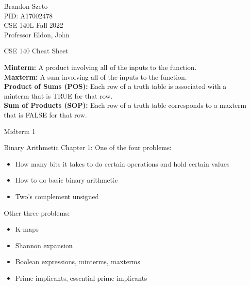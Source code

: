 \documentclass[10pt]{article}
\begin{document}
\begin{flushleft}
	Brandon Szeto \\
	PID: A17002478 \\
	CSE 140L Fall 2022 \\
    Professor Eldon, John \\

\begin{center}
	\Large CSE 140 Cheat Sheet
\end{center}

\textbf{Minterm:} A product involving all of the inputs to the function. \\
\textbf{Maxterm:} A sum involving all of the inputs to the function. \\
\textbf{Product of Sums (POS):} Each row of a truth table is associated with a
minterm that is TRUE for that row. \\
\textbf{Sum of Products (SOP):} Each row of a truth table corresponds to a
maxterm that is FALSE for that row. \\

\begin{center}
	\Large Midterm 1
\end{center}

Binary Arithmetic Chapter 1:
One of the four problems:
\begin{itemize}
    \item How many bits it takes to do certain operations and hold certain
        values
    \item How to do basic binary arithmetic 
    \item Two's complement unsigned
\end{itemize}

Other three problems:
\begin{itemize}
    \item K-maps
    \item Shannon expansion
    \item Boolean expressions, minterms, maxterms
    \item Prime implicants, essential prime implicants
\end{itemize}

\end{flushleft}
\end{document}
